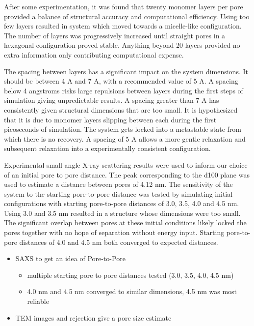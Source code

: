 \documentclass{article}
\begin{document}
	After some experimentation, it was found that twenty monomer layers per pore provided a balance of structural accuracy and computational efficiency. Using too few layers resulted in system which moved towards a micelle-like configuration. The number of layers was progressively increased until straight pores in a hexagonal configuration proved stable. Anything beyond 20 layers provided no extra information only contributing computational expense.  
	
	The spacing between layers has a significant impact on the system dimensions. It should be between 4 A and 7 A, with a recommended value of 5 A. A spacing below 4 angstroms risks large repulsions between layers during the first steps of simulation giving unpredictable results. A spacing greater than 7 A has consistently given structural dimensions that are too small. It is hypothesized that it is due to monomer layers slipping between each during the first picoseconds of simulation. The system gets locked into a metastable state from which there is no recovery. A spacing of 5 A allows a more gentle relaxation and subsequent relaxation into a experimentally consistent configuration.   
	
	Experimental small angle X-ray scattering results were used to inform our choice of an initial pore to pore distance. The peak corresponding to the d100 plane was used to estimate a distance between pores of 4.12 nm. The sensitivity of the system to the starting pore-to-pore distance was tested by simulating initial configurations with starting pore-to-pore distances of 3.0, 3.5, 4.0 and 4.5 nm. Using 3.0 and 3.5 nm resulted in a structure whose dimensions were too small. The significant overlap between pores at these initial conditions likely locked the pores together with no hope of separation without energy input. Starting pore-to-pore distances of 4.0 and 4.5 nm both converged to expected distances.   
	\begin{itemize}
		\item SAXS to get an idea of Pore-to-Pore
		\begin{itemize}
			\item multiple starting pore to pore distances tested (3.0, 3.5, 4.0, 4.5 nm)
			\item 4.0 nm and 4.5 nm converged to similar dimensions, 4.5 nm was most reliable
		\end{itemize}
		\item TEM images and rejection give a pore size estimate
	\end{itemize}
	
\end{document}
